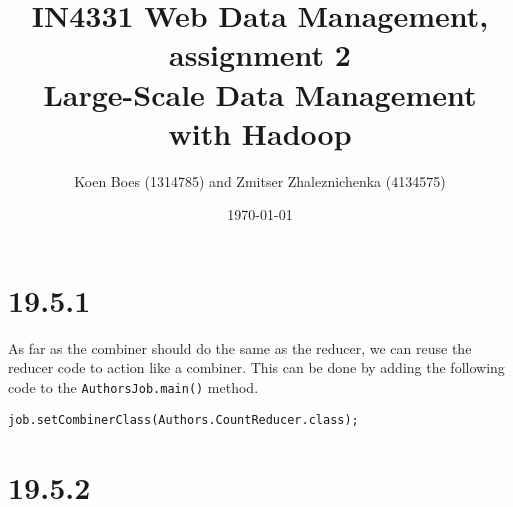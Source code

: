\documentclass[a4paper, notitlepage]{article}
\begin{document}
\title{IN4331 Web Data Management, assignment 2 \\
Large-Scale Data Management with Hadoop}
\author{Koen Boes (1314785) and Zmitser Zhaleznichenka (4134575)}
\date{\today}
\maketitle

\setcounter{secnumdepth}{0}

\section{19.5.1}

As far as the combiner should do the same as the reducer, we can reuse the reducer code to action like a combiner. This can be done by adding the following code to the \lstinline{AuthorsJob.main()} method.

\begin{lstlisting}
job.setCombinerClass(Authors.CountReducer.class);  
\end{lstlisting}

\section{19.5.2}
\end{document}

